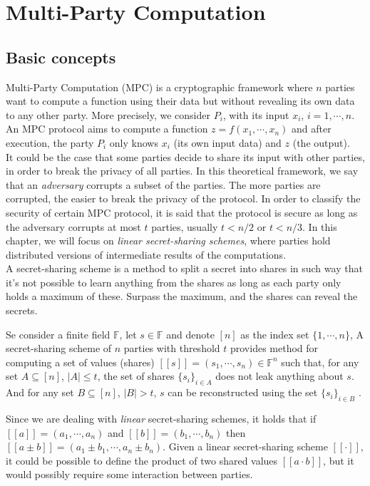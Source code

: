 \chapter{Multi-Party Computation}

\section{Basic concepts}

Multi-Party Computation (MPC) is a cryptographic framework where $n$ parties want to compute a function using their data but without revealing its own data to any other party.
More precisely, we consider $P_i$,  with its input $x_i$, $i=1,\cdots, n$. An MPC protocol aims to compute a function $z = f(x_1,\cdots, x_n)$ and after execution, the party $P_i$ only knows $x_i$ (its own input data) and $z$ (the output).\\
It could be the case that some parties decide to share its input with other parties, in order to break the privacy of all parties. In this theoretical framework, we say that an \textit{adversary} corrupts a subset of the parties. The more parties are corrupted, the easier to break the privacy of the protocol. In order to classify the security of certain MPC protocol, it is said that the protocol is secure as long as the adversary corrupts at most $t$ parties, usually $t< n/2$ or $t< n/3$.
In this chapter, we will focus on \textit{linear secret-sharing schemes}, where parties hold distributed versions of intermediate results of the computations.\\
A secret-sharing scheme is a method to split a secret into shares in such way that it's not possible to learn anything from the shares as long as each party only holds a maximum of these. Surpass the maximum, and the shares can reveal the secrets.

Se consider a finite field $\mathbb{F}$, let $s \in \mathbb{F}$ and denote $[n]$ as the index set $\{1,\cdots,n\}$, A secret-sharing scheme of $n$ parties with threshold $t$ provides method for computing a set of values (shares) $[[s]] = (s_1,\cdots, s_n) \in \mathbb{F}^n$ such that, for any set $A \subseteq [n]$, $|A| \leq t$, the set of shares $\{s_i\}_{i\in A}$ does not leak anything about $s$. And for any set $B \subseteq [n]$, $|B|>t$, $s$ can be reconstructed using the set $\{s_i\}_{i\in B}$ \cite{escudero2022}.

Since we are dealing with \textit{linear} secret-sharing schemes, it holds that if $[[a]] = (a_1,\cdots, a_n)$ and $[[b]] = (b_1,\cdots, b_n)$ then $[[a\pm b]] = (a_1 \pm b_1, \cdots, a_n \pm b_n)$.
Given a linear secret-sharing scheme $[[\cdot]]$, it could be possible to define the product of two shared values $[[a \cdot b]]$, but it would possibly require some interaction between parties.

